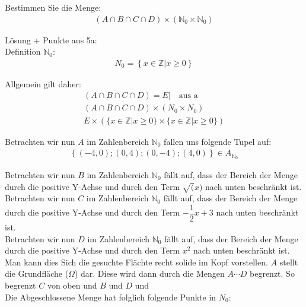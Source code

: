 Bestimmen Sie die Menge: 
\begin{eqnarray}
	\left(A \cap B \cap C \cap D \right) \times \left(\mathbb{N}_0 \times \mathbb{N}_0 \right)
\end{eqnarray}

Lösung + Punkte aus 5a: \\


Definition $\mathbb{N}_0$:
\begin{eqnarray}
	N_0 = \left\{x \in \mathbb{Z} \vert x \ge 0 \right\}
\end{eqnarray}

Allgemein gilt daher:
\begin{eqnarray}
	\left(A \cap B \cap C \cap D \right)  = E \vert  \text{~~~aus a~}\\
	\left(A \cap B \cap C \cap D \right) \times \left(N_0 \times N_0 \right)\\
	E \times (\{x\in \mathbb{Z}\vert x \ge 0\}\times \{x\in \mathbb{Z}\vert x \ge 0\}) 
\end{eqnarray}

Betrachten wir nun $A$ im Zahlenbereich $\mathbb{N}_0$ fallen uns folgende Tupel auf: \\
\begin{eqnarray}
	\left\{ (-4,0);(0,4); (0,-4); (4,0)\right\}\in A_{\mathbb{N}_0} 
\end{eqnarray}

Betrachten wir nun $B$ im Zahlenbereich $\mathbb{N}_0$ fällt auf, dass der Bereich der Menge durch die positive Y-Achse und durch den Term $\sqrt(x)$ nach unten beschränkt ist. \\

Betrachten wir nun $C$ im Zahlenbereich $\mathbb{N}_0$ fällt auf, dass der Bereich der Menge durch die positive Y-Achse und durch den Term $-\dfrac{1}{2}x+3$ nach unten beschränkt ist. \\

Betrachten wir nun $D$ im Zahlenbereich $\mathbb{N}_0$ fällt auf, dass der Bereich der Menge durch die positive Y-Achse und durch den Term $x^2$ nach unten beschränkt ist.\\

Man kann dies Sich die gesuchte Flächte recht solide im Kopf vorstellen. $A$ stellt die Grundfläche ($\Omega$) dar. Diese wird dann durch die Mengen $A \cdots D$ begrenzt. So begrenzt $C$ von oben und $B$ und $D$ und  \\

Die Abgeschlossene Menge hat folglich folgende Punkte in $N_0$:\\ 

